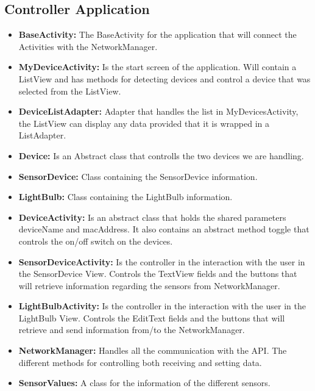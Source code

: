 \documentclass[a4paper]{article}
\begin{document}
	\subsection{Controller Application}
	\begin{itemize}
		\item{\textbf{BaseActivity:}} 
		The BaseActivity for the application that will connect the Activities with the NetworkManager.
		\item{\textbf{MyDeviceActivity:}} 
		Is the start screen of the application. Will contain a ListView and has methods for detecting devices and control a device that was selected from the ListView.
		\item{\textbf{DeviceListAdapter:}} 
		Adapter that handles the list in MyDevicesActivity, the ListView can display any data provided that it is wrapped in a ListAdapter. 
		\item{\textbf{Device:}} 
		Is an Abstract class that controlls the two devices we are handling. 
		\item{\textbf{SensorDevice:}} 
		Class containing the SensorDevice information.
		\item{\textbf{LightBulb:}}
		Class containing the LightBulb information.
		\item{\textbf{DeviceActivity:}} 
		Is an abstract class that holds the shared parameters deviceName and macAddress. It also contains an abstract method toggle that controls the on/off switch on the devices.
		\item{\textbf{SensorDeviceActivity:}} 
		Is the controller in the interaction with the user in the SensorDevice View. Controls the TextView fields and the buttons that will retrieve information regarding the sensors from NetworkManager.
		\item{\textbf{LightBulbActivity:}} 
		Is the controller in the interaction with the user in the LightBulb View. Controls the EditText fields and the buttons that will retrieve and send information from/to the NetworkManager.
		
		\item{\textbf{NetworkManager:}} 
		Handles all the communication with the API. The different methods for controlling both receiving and setting data.
		\item{\textbf{SensorValues:}} 
		A class for the information of the different sensors.
		
	\end{itemize}
\end{document}
